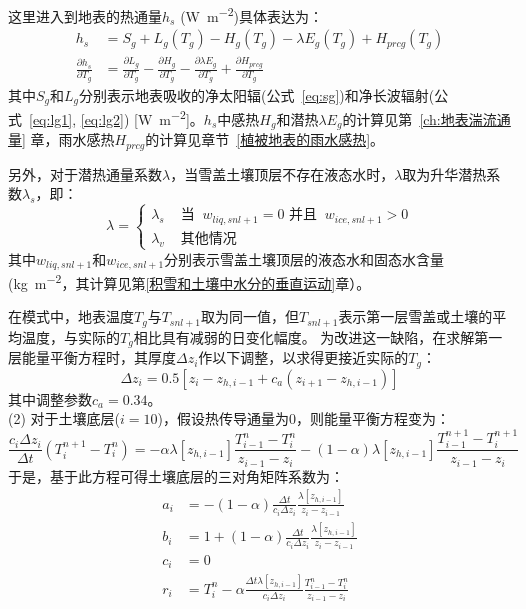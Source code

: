 这里进入到地表的热通量$h_s$ (\unit{W.m^{-2}})具体表达为：
\begin{equation}
\begin{aligned}
h_{s} &= S_{g}+L_{g}\left(T_{g}\right)-H_{g}\left(T_{g}\right)-\lambda E_{g}\left(T_{g}\right)+H_{p r c g}\left(T_{g}\right) \\[1.5ex]
\frac{\partial h_{s}}{\partial T_{g}} &= \frac{\partial L_{g}}{\partial T_{g}}-\frac{\partial H_{g}}{\partial T_{g}}-\frac{\partial \lambda E_{g}}{\partial T_{g}}+\frac{\partial H_{p r c g}}{\partial T_{g}}
\end{aligned}
\end{equation}
其中$S_g$和$L_g$分别表示地表吸收的净太阳辐(公式~\ref{eq:sg})和净长波辐射(公式~\ref{eq:lg1}, \ref{eq:lg2}) [\unit{W.m^{-2}}]。$h_s$中感热$H_{g}$和潜热$\lambda E_g$的计算见第~\ref{ch:地表湍流通量} 章，雨水感热$H_{prcg}$的计算见章节~\ref{植被地表的雨水感热}。

另外，对于潜热通量系数$\lambda$，当雪盖土壤顶层不存在液态水时，$\lambda$取为升华潜热系数$\lambda_s$，即：
\begin{equation}
\lambda=\left\{\begin{array}{lr}\lambda_{s} & \text { 当 }\ w_{liq, s n l+1}=0 \text { 并且 }\ w_{ice, s n l+1}>0 \\ \lambda_{v} & \text { 其他情况 }\end{array}\right.
\end{equation}
其中$w_{liq,snl+1}$和$w_{ice,snl+1}$分别表示雪盖土壤顶层的液态水和固态水含量 (\unit{kg.m^{-2}}，其计算见第\ref{积雪和土壤中水分的垂直运动}章）。

在模式中，地表温度$T_g$与$T_{snl+1}$取为同一值，但$T_{snl+1}$表示第一层雪盖或土壤的平均温度，与实际的$T_g$相比具有减弱的日变化幅度。
为改进这一缺陷，在求解第一层能量平衡方程时，其厚度$\Delta z_i$作以下调整，以求得更接近实际的$T_g$：
\begin{equation}
\Delta z_{i}=0.5\left[z_{i}-z_{h, i-1}+c_{a}\left(z_{i+1}-z_{h, i-1}\right)\right]
\end{equation}
其中调整参数$c_a=0.34$。\\
(2) 对于土壤底层($i=10$)，假设热传导通量为0，则能量平衡方程变为：
\begin{equation}
\frac{c_{i} \Delta z_{i}}{\Delta t}\left(T_{i}^{n+1}-T_{i}^{n}\right)=-\alpha \lambda\left[z_{h, i-1}\right] \frac{T_{i-1}^{n}-T_{i}^{n}}{z_{i-1}-z_{i}}-(1-\alpha) \lambda\left[z_{h, i-1}\right] \frac{T_{i-1}^{n+1}-T_{i}^{n+1}}{z_{i-1}-z_{i}}
\end{equation}
于是，基于此方程可得土壤底层的三对角矩阵系数为：
\begin{equation}
\begin{aligned}
a_{i} &= -(1-\alpha) \frac{\Delta t}{c_{i} \Delta z_{i}} \frac{\lambda\left[z_{h, i-1}\right]}{z_{i}-z_{i-1}} \\
b_{i} &= 1+(1-\alpha) \frac{\Delta t}{c_{i} \Delta z_{i}} \frac{\lambda\left[z_{h, i-1}\right]}{z_{i}-z_{i-1}} \\
c_{i} &= 0 \\
r_{i} &= T_{i}^{n}-\alpha \frac{\Delta t \lambda\left[z_{h, i-1}\right]}{c_{i} \Delta z_{i}} \frac{T_{i-1}^{n}-T_{i}^{n}}{z_{i-1}-z_{i}}
\end{aligned}
\end{equation}

